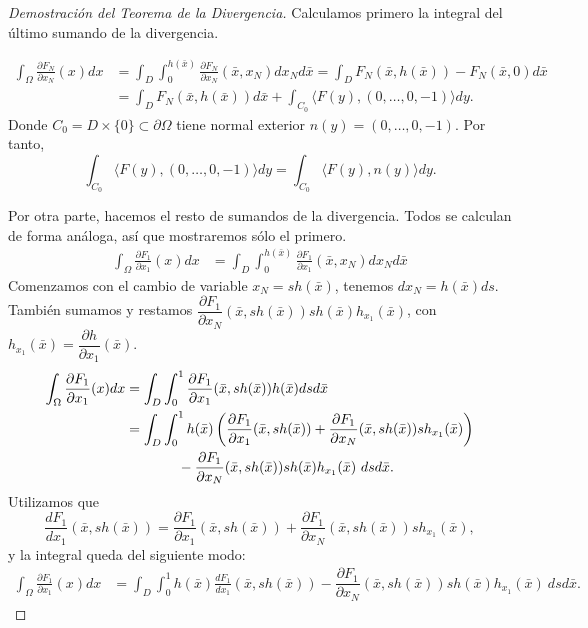 \documentclass[12pt,spanish]{article}
\theoremstyle{definition}
\theoremstyle{remark}
\begin{document}
\begin{proof}[Demostración del Teorema de la Divergencia]
	Calculamos primero la integral del último sumando de la divergencia.
	
	\begin{align*}
	\int_\Omega\frac{\partial F_N}{\partial x_N}(x)dx&= \int_D\int_0^{h(\bar{x})}\frac{\partial F_N}{\partial x_N}(\bar{x},x_N)d x_N d\bar{x} = \int_D  F_N(\bar{x},h(\bar{x}))-F_N(\bar{x},0) d\bar{x} \\ 
	&= \int_D  F_N(\bar{x},h(\bar{x}))d\bar{x}+\int_{C_0}\langle F(y),(0,\ldots,0,-1) \rangle dy.
	\end{align*}
	Donde $C_0=D\times \{0\}\subset\partial\Omega$ tiene normal exterior $n(y)=(0,\ldots,0,-1)$. Por tanto,
	\[\int_{C_0}\langle F(y),(0,\ldots,0,-1) \rangle dy=\int_{C_0}\langle F(y),n(y)\rangle dy.\]
	
	Por otra parte, hacemos el resto de sumandos de la divergencia. Todos se calculan de forma análoga, así que mostraremos sólo el primero.
	\begin{align*}
	\int_\Omega\frac{\partial F_1}{\partial x_1}(x)dx&= \int_D\int_0^{h(\bar{x})}\frac{\partial F_1}{\partial x_1}(\bar{x},x_N)d x_N d\bar{x}
	\end{align*}
	Comenzamos con el cambio de variable $x_N=s h(\bar{x})$, tenemos $dx_N=h(\bar{x})ds$. También sumamos y restamos $\dfrac{\partial F_1}{\partial x_N}(\bar{x},sh(\bar{x}))sh(\bar{x})h_{x_1}(\bar{x})$, con $h_{x_1}(\bar{x})=\dfrac{\partial h}{\partial x_1}(\bar{x})$.
	\begin{align*}
	\int_\Omega\frac{\partial F_1}{\partial x_1}(x)dx&= \int_D\int_0^1\frac{\partial F_1}{\partial x_1}(\bar{x},s h(\bar{x})) h(\bar{x})ds d\bar{x} \\
	&=\int_D\int_0^1 h(\bar{x})\left(\frac{\partial F_1}{\partial x_1}(\bar{x},sh(\bar{x}))+\dfrac{\partial F_1}{\partial x_N}(\bar{x},sh(\bar{x}))sh_{x_1}(\bar{x})\right)\\
	&~\hspace{12mm}-\dfrac{\partial F_1}{\partial x_N}(\bar{x},sh(\bar{x}))sh(\bar{x})h_{x_1}(\bar{x}) \ dsd\bar{x}.
	\end{align*}
	Utilizamos que \[\frac{d F_1}{d x_1}(\bar{x},sh(\bar{x}))=\frac{\partial F_1}{\partial x_1}(\bar{x},sh(\bar{x}))+\dfrac{\partial F_1}{\partial x_N}(\bar{x},sh(\bar{x}))sh_{x_1}(\bar{x}),\]
	y la integral queda del siguiente modo:
	\begin{align}\label{eq:div-1}
	\int_\Omega\frac{\partial F_1}{\partial x_1}(x)dx
	&=\int_D\int_0^1 h(\bar{x})\frac{d F_1}{d x_1}(\bar{x},sh(\bar{x}))-\dfrac{\partial F_1}{\partial x_N}(\bar{x},sh(\bar{x}))sh(\bar{x})h_{x_1}(\bar{x}) \ dsd\bar{x}.

\end{align}
\end{proof}
\end{document}
